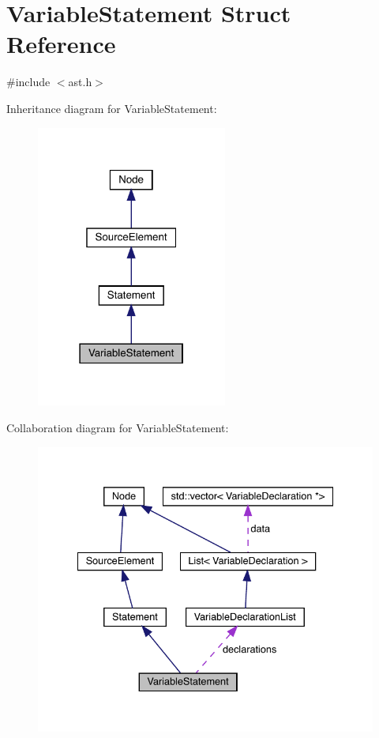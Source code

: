 \hypertarget{struct_variable_statement}{}\section{Variable\+Statement Struct Reference}
\label{struct_variable_statement}


{\ttfamily \#include $<$ast.\+h$>$}



Inheritance diagram for Variable\+Statement\+:\nopagebreak
\begin{figure}[H]
\begin{center}
\leavevmode
\includegraphics[width=178pt]{struct_variable_statement__inherit__graph}
\end{center}
\end{figure}


Collaboration diagram for Variable\+Statement\+:\nopagebreak
\begin{figure}[H]
\begin{center}
\leavevmode
\includegraphics[width=335pt]{struct_variable_statement__coll__graph}
\end{center}
\end{figure}
